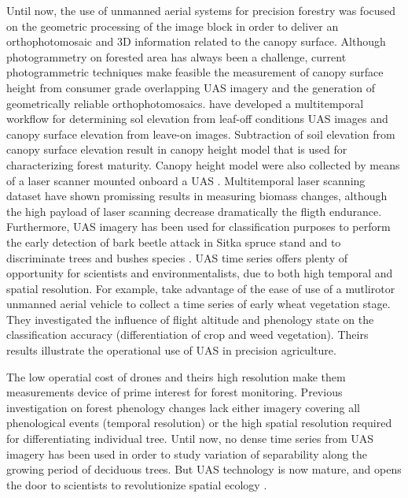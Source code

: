 \documentclass[remotesensing,article,submit,moreauthors,pdftex,12pt,a4paper]{mdpi} %
\begin{document}
Until now, the use of unmanned aerial systems for precision forestry was focused on the geometric processing of the image block in order to deliver an orthophotomosaic and 3D information related to the canopy surface. 
Although photogrammetry on forested area has always been a challenge, current photogrammetric techniques make feasible the measurement of canopy surface height from consumer grade overlapping UAS imagery and the generation of geometrically reliable orthophotomosaics. 
\citeauthor{dandois_high_2013} \cite{dandois_high_2013} have developed a multitemporal workflow for determining sol elevation from leaf-off conditions UAS images and canopy surface elevation from leave-on images. 
Subtraction of soil elevation from canopy surface elevation result in canopy height model that is used for characterizing forest maturity. 
Canopy height model were also collected by means of a laser scanner mounted onboard a UAS \cite{jaakkola_low-cost_2010}. 
Multitemporal laser scanning dataset have shown promissing results in measuring biomass changes, although the high payload of laser scanning decrease dramatically the fligth endurance.
Furthermore, UAS imagery has been used for classification purposes to perform the early detection of bark beetle attack in Sitka spruce stand \cite{drauschke_towards_2014} and to discriminate trees and bushes species \cite{gini_use_2014}. 
UAS time series offers plenty of opportunity for scientists and environmentalists, due to both high temporal and spatial resolution. 
For example, \citeauthor{torres-sanchez_multi-temporal_2014} \cite{torres-sanchez_multi-temporal_2014} take advantage of the ease of use of a mutlirotor unmanned aerial vehicle to collect a time series of early wheat vegetation stage. 
They investigated the influence of flight altitude and phenology state on the classification accuracy (differentiation of crop and weed vegetation).
Theirs results illustrate the operational use of UAS in precision agriculture. 

The low operatial cost of drones and theirs high resolution make them measurements device of prime interest for forest monitoring. 
Previous investigation on forest phenology changes lack either imagery covering all phenological events (temporal resolution) or the high spatial resolution required for differentiating individual tree.
Until now, no dense time series from UAS imagery has been used in order to study variation of separability along the growing period of deciduous trees.
But UAS technology is now mature, and opens the door to scientists to revolutionize spatial ecology \cite{anderson_lightweight_2013}.
\end{document}
